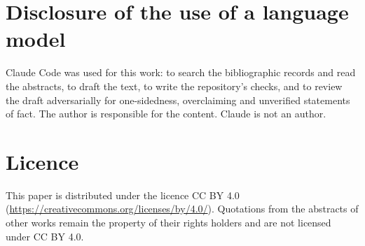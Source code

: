 \documentclass[11pt]{article}
\begin{document}
\section*{Disclosure of the use of a language model}
Claude Code was used for this work: to search the bibliographic records and read the abstracts, to draft the text, to write the repository's checks, and to review the draft adversarially for one-sidedness, overclaiming and unverified statements of fact. The author is responsible for the content. Claude is not an author.

\section*{Licence}
This paper is distributed under the licence CC BY 4.0 (\url{https://creativecommons.org/licenses/by/4.0/}). Quotations from the abstracts of other works remain the property of their rights holders and are not licensed under CC BY 4.0.
\end{document}

